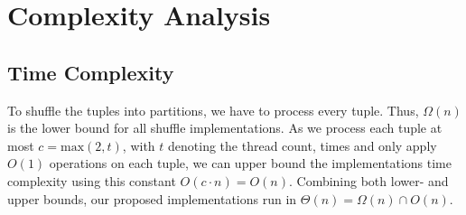 \section{Complexity Analysis}
\subsection{Time Complexity}
To shuffle the tuples into partitions, we have to process every tuple.
Thus, $\Omega(n)$ is the lower bound for all shuffle implementations.
As we process each tuple at most $c = \textrm{max}(2, t)$, with $t$ denoting the thread count, times and only apply $O(1)$ operations on each tuple, we can upper bound the implementations time complexity using this constant $O(c\cdot n) = O(n)$.
Combining both lower- and upper bounds, our proposed implementations run in $\Theta(n) = \Omega(n) \cap O(n) $.

